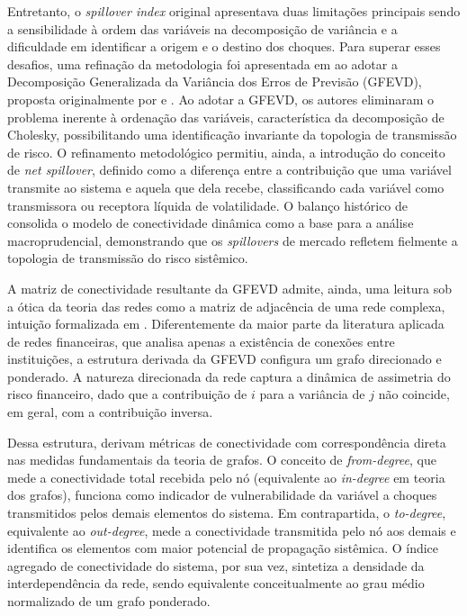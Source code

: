 \documentclass[12pt, a4paper, oneside, english, brazil]{abntex2}
\begin{document}
Entretanto, o \textit{spillover index} original apresentava duas limitações
principais sendo a sensibilidade à ordem das variáveis na decomposição de variância e a
dificuldade em identificar a origem e o destino dos choques. Para superar esses
desafios, uma refinação da metodologia foi apresentada em \textcite{diebold2012} ao adotar 
a Decomposição Generalizada da Variância dos Erros de Previsão (GFEVD), proposta 
originalmente por \textcite{koop1996} e \textcite{pesaran1998}. Ao adotar a GFEVD, os autores
eliminaram o problema inerente à ordenação das variáveis, característica da decomposição
de Cholesky, possibilitando uma identificação invariante da topologia de transmissão de
risco. O refinamento metodológico permitiu, ainda, a introdução do conceito de
\textit{net spillover}, definido como a diferença entre a contribuição que uma variável
transmite ao sistema e aquela que dela recebe, classificando cada variável como
transmissora ou receptora líquida de volatilidade. 
O balanço histórico de \textcite{diebold2023} consolida o modelo de conectividade dinâmica
como a base para a análise macroprudencial, demonstrando que os \textit{spillovers} de mercado
refletem fielmente a topologia de transmissão do risco sistêmico.

A matriz de conectividade resultante da GFEVD admite, ainda, uma leitura sob a ótica 
da teoria das redes como a matriz de adjacência de uma rede complexa,
intuição formalizada em \textcite{diebold2014}. Diferentemente da maior parte da literatura 
aplicada de redes financeiras, que analisa apenas a existência de conexões entre instituições, 
a estrutura derivada da GFEVD configura um grafo direcionado e ponderado. 
A natureza direcionada da rede captura a dinâmica de assimetria do risco financeiro, dado 
que a contribuição de $i$ para a variância de $j$ não coincide, em geral, com a 
contribuição inversa.

Dessa estrutura, \textcite{diebold2014} derivam métricas de conectividade com
correspondência direta nas medidas fundamentais da teoria de grafos.
O conceito de \textit{from-degree}, que mede a conectividade total recebida pelo nó
(equivalente ao \textit{in-degree} em teoria dos grafos), funciona como indicador de
vulnerabilidade da variável a choques transmitidos pelos demais elementos do sistema.
Em contrapartida, o \textit{to-degree}, equivalente ao \textit{out-degree}, mede a
conectividade transmitida pelo nó aos demais e identifica os elementos com maior potencial
de propagação sistêmica. O índice agregado de conectividade do sistema, por sua vez,
sintetiza a densidade da interdependência da rede, sendo equivalente conceitualmente ao
grau médio normalizado de um grafo ponderado.
\end{document}
